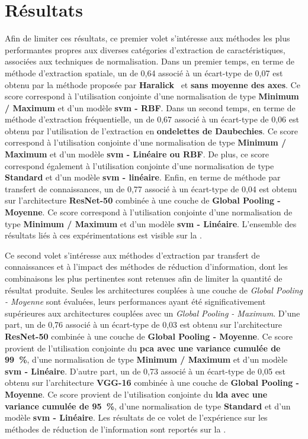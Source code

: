 \section{Résultats}
Afin de limiter ces résultats, ce premier volet s'intéresse aux méthodes les plus performantes propres aux diverses catégories d'extraction de caractéristiques, associées aux techniques de normalisation. Dans un premier temps, en terme de méthode d'extraction spatiale, un \fscore{} de 0,64 associé à un écart-type de 0,07 est obtenu par la méthode proposée par \textbf{Haralick}~ et \textbf{sans moyenne des axes}. Ce score correspond à l'utilisation conjointe d'une normalisation de type \textbf{Minimum / Maximum} et d'un modèle \textbf{\gls{svm} - RBF}. Dans un second temps, en terme de méthode d'extraction fréquentielle, un \fscore{} de 0,67 associé à un écart-type de 0,06 est obtenu par l'utilisation de l'extraction en \textbf{ondelettes de Daubechies}. Ce score correspond à l'utilisation conjointe d'une normalisation de type \textbf{Minimum / Maximum} et d'un modèle \textbf{\gls{svm} - Linéaire ou RBF}. De plus, ce score correspond également à l'utilisation conjointe d'une normalisation de type \textbf{Standard} et d'un modèle \textbf{\gls{svm} - linéaire}. Enfin, en terme de méthode par transfert de connaissances, un \fscore{} de 0,77 associé à un écart-type de 0,04 est obtenu sur l'architecture \textbf{ResNet-50} combinée à une couche de \textbf{Global Pooling - Moyenne}. Ce score correspond à l'utilisation conjointe d'une normalisation de type \textbf{Minimum / Maximum} et d'un modèle \textbf{\gls{svm} - Linéaire}. L'ensemble des résultats liés à ces expérimentations est visible sur la .\par

Ce second volet s’intéresse aux méthodes d’extraction par transfert de connaissances et à l’impact des méthodes de réduction d'information, dont les combinaisons les plus pertinentes sont retenues afin de limiter la quantité de résultat produite. Seules les architectures couplées à une couche de \textit{Global Pooling - Moyenne} sont évaluées, leurs performances ayant été significativement supérieures aux architectures couplées avec un \textit{Global Pooling - Maximum}. D'une part, un \fscore{} de 0,76 associé à un écart-type de 0,03 est obtenu sur l'architecture \textbf{ResNet-50} combinée à une couche de \textbf{Global Pooling - Moyenne}. Ce score provient de l'utilisation conjointe du \textbf{\gls{pca} avec une variance cumulée de 99~\%}, d'une normalisation de type \textbf{Minimum / Maximum} et d'un modèle \textbf{\gls{svm} - Linéaire}. D'autre part, un \fscore{} de 0,73 associé à un écart-type de 0,05 est obtenu sur l'architecture \textbf{VGG-16} combinée à une couche de \textbf{Global Pooling - Moyenne}. Ce score provient de l'utilisation conjointe du \textbf{\gls{lda} avec une variance cumulée de 95~\%}, d'une normalisation de type \textbf{Standard} et d'un modèle \textbf{\gls{svm} - Linéaire}. Les résultats de ce volet de l'expérience sur les méthodes de réduction de l'information sont reportés sur la .\par

